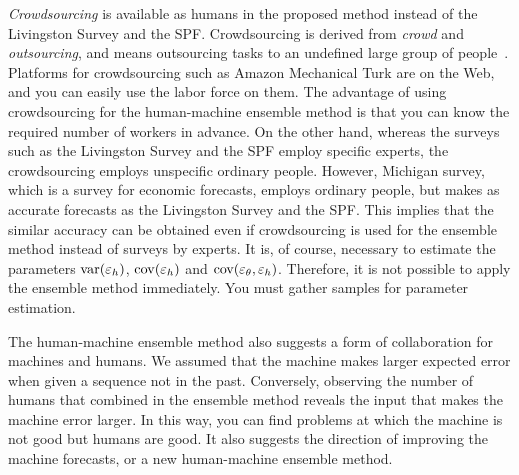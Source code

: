 \documentclass[../main.tex]{subfiles}
\begin{document}
\emph{Crowdsourcing} is available as humans in the proposed method instead of the Livingston Survey and the SPF\@.
Crowdsourcing is derived from \emph{crowd} and \emph{outsourcing}, and means outsourcing tasks to an undefined large group of people~\cite{Howe2008}.
Platforms for crowdsourcing such as Amazon Mechanical Turk are on the Web, and you can easily use the labor force on them.
The advantage of using crowdsourcing for the human-machine ensemble method is that you can know the required number of workers in advance.
On the other hand, whereas the surveys such as the Livingston Survey and the SPF employ specific experts, the crowdsourcing employs unspecific ordinary people.
However, Michigan survey, which is a survey for economic forecasts, employs ordinary people, but makes as accurate forecasts as the Livingston Survey and the SPF.
This implies that the similar accuracy can be obtained even if crowdsourcing is used for the ensemble method instead of surveys by experts.
It is, of course, necessary to estimate the parameters $\operatorname{var}(\varepsilon_h)$, $\operatorname{cov}(\varepsilon_h)$ and $\operatorname{cov}(\varepsilon_\theta, \varepsilon_h)$.
Therefore, it is not possible to apply the ensemble method immediately.
You must gather samples for parameter estimation.

The human-machine ensemble method also suggests a form of collaboration for machines and humans.
We assumed that the machine makes larger expected error when given a sequence not in the past.
Conversely, observing the number of humans that combined in the ensemble method reveals the input that makes the machine error larger.
In this way, you can find problems at which the machine is not good but humans are good.
It also suggests the direction of improving the machine forecasts, or a new human-machine ensemble method.
\end{document}
